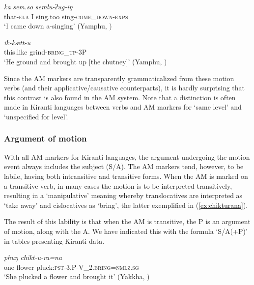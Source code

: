 \documentclass[oneside,a4paper,11pt]{article}
\newcommand{\ipa}[1]{{\phon\textit{#1}}}
\newcommand{\sens}[1]{‘#1’}
\newcommand{\rouge}[1]{{\color{red}#1}}
\begin{document}
\begin{exe}
\ex \label{ex:semluuging}
 \gll \ipa{mo.ba}	\ipa{ka}	\ipa{sem.so}	\ipa{semlu-\rouge{ʔug}-iŋ} \\
that-\textsc{ela} I sing.too sing-\textsc{\rouge{come\_down}}-\textsc{exps} \\
\glt \sens{I came down a-singing} (Yamphu, \citealt[143]{rutgers98yamphu})
\end{exe}

\begin{exe}
\ex \label{ex:ikkaettu}
 \gll \ipa{i.doʔ}	\ipa{ik-\rouge{kætt}-u} \\
this.like grind-\textsc{\rouge{bring\_up}}-3P \\
\glt \sens{He ground and brought up [the chutney]} (Yamphu, \citealt[144]{rutgers98yamphu})
\end{exe}

 Since the AM markers are transparently grammaticalized from these motion verbs (and their applicative/causative counterparts), it is hardly surprising that this contrast is also found in the AM system.
Note that a distinction is often made in Kiranti languages between verbs and AM markers for `same level' and `unspecified for level'.

 

  \subsubsection{Argument of motion} \label{sec:argument.khaling}
With all AM markers for Kiranti languages, the argument undergoing the motion event always includes the subject (S/A).  The AM markers tend, however, to be labile, having both intransitive and transitive forms.  When the AM is marked on a transitive verb, in many cases the motion is to be interpreted transitively, resulting in a `manipulative' meaning whereby translocatives are interpreted as `take away' and cislocatives as `bring', the latter exemplified in (\ref{ex:chikturana}).

The result of this lability is that when the AM is transitive, the P is an argument of motion, along with the A.
We have indicated this with the formula `S/A(+P)' in tables presenting Kiranti data.
 
\begin{exe}
\ex \label{ex:chikturana}
 \gll  \ipa{eko}	\ipa{phuŋ}	\ipa{chikt-u-\rouge{ra}=na} \\
one flower pluck:\textsc{pst}-3.P-\rouge{V_2.\textsc{bring}}=\textsc{nmlz.sg} \\
\glt \sens{She plucked a flower and brought it} (Yakkha, \citealt[312]{schackow15yakkha})
\end{exe}
\end{document}
